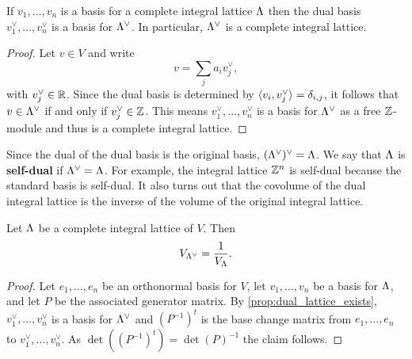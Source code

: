     \begin{proposition}\label{prop:dual_lattice_exists}
      If \(v_{1},\ldots,v_{n}\) is a basis for a complete integral lattice \(\Lambda\) then the dual basis \(v_{1}^{\vee},\ldots,v_{n}^{\vee}\) is a basis for \(\Lambda^{\vee}\). In particular, \(\Lambda^{\vee}\) is a complete integral lattice.
    \end{proposition}
    \begin{proof}
      Let \(v \in V\) and write
      \[
        v = \sum_{j}a_{i}v_{j}^{\vee},
      \]
      with \(v_{j}^{\vee} \in \mathbb{R}\). Since the dual basis is determined by \(\langle v_{i},v_{j}^{\vee}\rangle = \delta_{i,j}\), it follows that \(v \in \Lambda^{\vee}\) if and only if \(v_{j}^{\vee} \in \mathbb{Z}\). This means \(v_{1}^{\vee},\ldots,v_{n}^{\vee}\) is a basis for \(\Lambda^{\vee}\) as a free \(\mathbb{Z}\)-module and thus is a complete integral lattice.
    \end{proof}

    Since the dual of the dual basis is the original basis, \((\Lambda^{\vee})^{\vee} = \Lambda\). We say that \(\Lambda\) is \textbf{self-dual} if \(\Lambda^{\vee} = \Lambda\). For example, the integral lattice \(\mathbb{Z}^{n}\) is self-dual because the standard basis is self-dual. It also turns out that the covolume of the dual integral lattice is the inverse of the volume of the original integral lattice.

    \begin{proposition}\label{prop:covolume_of_dual_is_inverse}
      Let \(\Lambda\) be a complete integral lattice of \(V\). Then
      \[
        V_{\Lambda^{\vee}} = \frac{1}{V_{\Lambda}}.
      \]
    \end{proposition}
    \begin{proof}
      Let \(e_{1},\ldots,e_{n}\) be an orthonormal basis for \(V\), let \(v_{1},\ldots,v_{n}\) be a basis for \(\Lambda\), and let \(P\) be the associated generator matrix. By \cref{prop:dual_lattice_exists}, \(v_{1}^{\vee},\ldots,v_{n}^{\vee}\) is a basis for \(\Lambda^{\vee}\) and \((P^{-1})^{t}\) is the base change matrix from \(e_{1},\ldots,e_{n}\) to \(v_{1}^{\vee},\ldots,v_{n}^{\vee}\). As \(\det((P^{-1})^{t}) = \det(P)^{-1}\) the claim follows.
    \end{proof}
    
